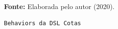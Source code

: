 \begin{figure}[ht!]
\centering

\caption{\textmd{\texttt{Behaviors da DSL Cotas}}}
\label{fig:behaviorlista}

\par\medskip\textbf{Fonte:} Elaborada pelo autor (2020). \par\medskip

\end{figure}

